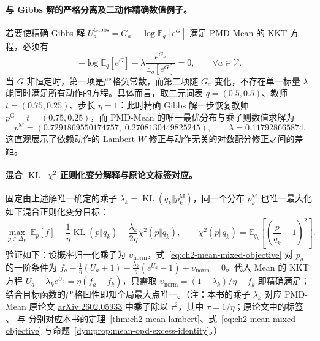 \documentclass[lang=cn,scheme=chinese,openany]{elegantbook}
\newcommand{\E}{\mathbb E}
\newcommand{\KL}{\operatorname{KL}}
\begin{document}
\paragraph{与 Gibbs 解的严格分离及二动作精确数值例子。}
若要使精确 Gibbs 解 $U_a^{\mathrm{Gibbs}}=G_a-\log\E_q[e^G]$ 满足 PMD-Mean 的 KKT 方程，必须有
\begin{equation*}
-\log\E_q[e^G]+\lambda\frac{e^{G_a}}{\E_q[e^G]}=0,\qquad \forall a\in\mathcal V.
\end{equation*}
当 $G$ 非恒定时，第一项是严格负常数，而第二项随 $G_a$ 变化，不存在单一标量 $\lambda$ 能同时满足所有动作的方程。具体而言，取二元词表 $q=(0.5,0.5)$、教师 $t=(0.75,0.25)$、步长 $\eta=1$：此时精确 Gibbs 解一步恢复教师 $p^{\mathrm G}=t=(0.75,0.25)$，而 PMD-Mean 的唯一最优分布与乘子则数值求解为
\begin{equation*}
p^{\mathrm M}=(0.7291869550174757,\; 0.2708130449825245),\qquad
\lambda=0.117928665874.
\end{equation*}
这直观展示了依赖动作的 Lambert-$W$ 修正与动作无关的对数配分修正之间的差距。

\paragraph{混合 $\KL$--$\chi^2$ 正则化变分解释与原论文标签对应。}
固定由上述解唯一确定的乘子 $\lambda_k=\KL(q_k\Vert p_k^{\mathrm M})$，同一个分布 $p_k^{\mathrm M}$ 也唯一最大化如下混合正则化变分目标：
\begin{equation}
\max_{p\in\Delta_V}\ \mathbb E_p[f]-\frac1\eta\operatorname{KL}(p\Vert q_k)
-\frac{\lambda_k}{2\eta}\chi^2(p\Vert q_k),
\qquad
\chi^2(p\Vert q_k)=\mathbb E_{ q_k}\left[\left(\frac p{ q_k}-1\right)^2\right].
\label{eq:ch2-mean-mixed-objective}
\end{equation}
验证如下：设概率归一化乘子为 $\upsilon_{\mathrm{norm}}$，式~\eqref{eq:ch2-mean-mixed-objective} 对 $p_a$ 的一阶条件为 $f_a-\frac1\eta(U_a+1)-\frac{\lambda_k}{\eta}(e^{U_a}-1)+\upsilon_{\mathrm{norm}}=0$。代入 Mean 的 KKT 方程 $U_a+\lambda_k e^{U_a}=\eta(f_a-\bar f_k)$，只需取 $\upsilon_{\mathrm{norm}}=(1-\lambda_k)/\eta-\bar f_k$ 即精确满足；结合目标函数的严格凹性即知全局最大点唯一。（注：本书的乘子 $\lambda_k$ 对应 PMD-Mean 原论文 \href{https://arxiv.org/abs/2602.05933}{arXiv:2602.05933} 中乘子除以 $\tau^2$，其中 $\tau=1/\eta$；原论文中的标签 、 与  分别对应本书的定理~\ref{thm:ch2-mean-lambert}、式~\eqref{eq:ch2-mean-mixed-objective} 与命题~\ref{dyn:prop:mean-opd-excess-identity}。）
\end{document}

